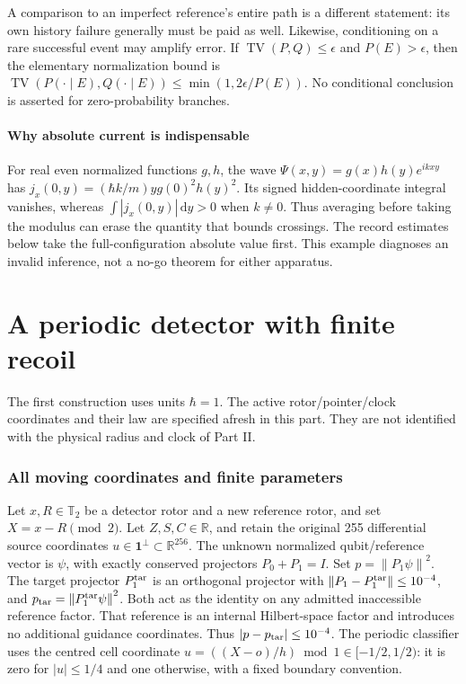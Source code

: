 \documentclass[11pt]{article}
\theoremstyle{definition}\newtheorem{definition}[theorem]{Definition}
\theoremstyle{remark}\newtheorem{remark}[theorem]{Remark}
\newcommand{\norm}[1]{\left\lVert#1\right\rVert}
\newcommand{\TV}{\operatorname{TV}}\newcommand{\Var}{\operatorname{Var}}
\newcommand{\one}{\mathbf1}\newcommand{\R}{\mathbb R}\newcommand{\T}{\mathbb T}
\newcommand{\dd}{\,\mathrm d}\newcommand{\Imv}{\operatorname{Im}}\newcommand{\ii}{\mathrm i}
\begin{document}
A comparison to an imperfect reference's entire path is a different
statement: its own history failure generally must be paid as well.
Likewise, conditioning on a rare successful event may amplify error.
If $\TV(P,Q)\le\epsilon$ and $P(E)>\epsilon$, then the elementary
normalization bound is $\TV(P(\cdot\mid E),Q(\cdot\mid E))
\le\min(1,2\epsilon/P(E))$. No conditional conclusion is asserted for
zero-probability branches.

\subsection{Why absolute current is indispensable}
For real even normalized functions $g,h$, the wave
$\Psi(x,y)=g(x)h(y)e^{ikxy}$ has
$j_x(0,y)=(\hbar k/m)y g(0)^2h(y)^2$. Its signed hidden-coordinate
integral vanishes, whereas $\int |j_x(0,y)|\dd y>0$ when $k\ne0$.
Thus averaging before taking the modulus can erase the quantity that
bounds crossings. The record estimates below take the full-configuration
absolute value first. This example diagnoses an invalid inference, not
a no-go theorem for either apparatus.

\part{A periodic detector with finite recoil}
The first construction uses units $\hbar=1$. The active rotor/pointer/clock
coordinates and their law are specified afresh in this part. They are not
identified with the physical radius and clock of Part II.
\section{All moving coordinates and finite parameters}
Let $x,R\in\T_2$ be a detector rotor and a new reference rotor, and set $X=x-R\pmod2$. Let $Z,S,C\in\R$, and retain the original 255 differential source coordinates $u\in\one^\perp\subset\R^{256}$. The unknown normalized qubit/reference vector is $\psi$, with exactly conserved projectors $P_0+P_1=I$.
Set $p=\norm{P_1\psi}^2$. The target projector $P_1^{\rm tar}$ is an
orthogonal projector with $\norm{P_1-P_1^{\rm tar}}\le10^{-4}$,
and $p_{\rm tar}=\norm{P_1^{\rm tar}\psi}^2$. Both act as the identity
on any admitted inaccessible reference factor. That reference is an internal
Hilbert-space factor and introduces no additional guidance coordinates. Thus $|p-p_{\rm tar}|\le10^{-4}$.
The periodic classifier uses the centred cell coordinate
$u=((X-o)/h)\bmod1\in[-1/2,1/2)$: it is zero for $|u|\le1/4$
and one otherwise, with a fixed boundary convention.
\end{document}
